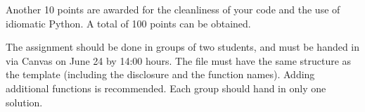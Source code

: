 \documentclass[a4paper]{report}
\theoremstyle{definition}
\begin{document}
Another 10 points are awarded for the cleanliness of your code and the
use of idiomatic Python. A total of 100 points can be obtained.

The assignment should be done in groups of two students, and must be
handed in via Canvas on June 24 by 14:00 hours. The file must
have the same structure as the template (including the disclosure
and the function names). Adding additional functions is recommended.
Each group should hand in only one solution.
\end{document}
